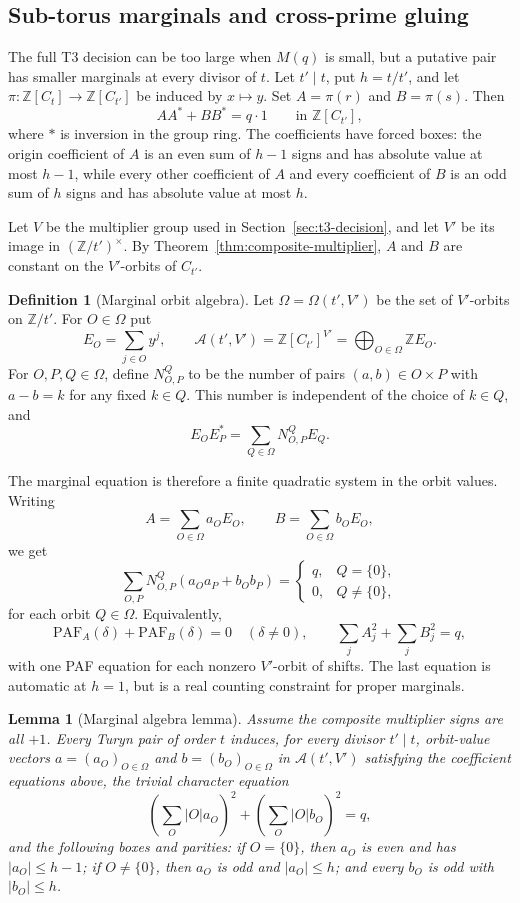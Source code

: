 \documentclass[11pt]{article}
\theoremstyle{plain}
\newtheorem{lemma}[theorem]{Lemma}
\theoremstyle{definition}
\newtheorem{definition}[theorem]{Definition}
\theoremstyle{remark}
\newcommand{\Z}{\mathbb Z}
\newcommand{\paf}{\mathrm{PAF}}
\begin{document}
\subsection{Sub-torus marginals and cross-prime gluing}\label{sec:t2-marginal}

The full T3 decision can be too large when $M(q)$ is small, but a putative pair
has smaller marginals at every divisor of $t$. Let $t'\mid t$, put $h=t/t'$, and
let $\pi:\Z[C_t]\to\Z[C_{t'}]$ be induced by $x\mapsto y$. Set
$A=\pi(r)$ and $B=\pi(s)$. Then
\[
  AA^*+BB^*=q\cdot1\qquad\text{in }\Z[C_{t'}],
\]
where $*$ is inversion in the group ring. The coefficients have forced boxes:
the origin coefficient of $A$ is an even sum of $h-1$ signs and has absolute
value at most $h-1$, while every other coefficient of $A$ and every coefficient
of $B$ is an odd sum of $h$ signs and has absolute value at most $h$.

Let $V$ be the multiplier group used in Section~\ref{sec:t3-decision}, and let
$V'$ be its image in $(\Z/t')^\times$. By
Theorem~\ref{thm:composite-multiplier}, $A$ and $B$ are constant on the
$V'$-orbits of $C_{t'}$.

\begin{definition}[Marginal orbit algebra]\label{def:marginal-orbit-algebra}
Let $\Omega=\Omega(t',V')$ be the set of $V'$-orbits on $\Z/t'$. For
$O\in\Omega$ put
\[
  E_O=\sum_{j\in O} y^j,\qquad
  \mathcal A(t',V')=\Z[C_{t'}]^{V'}=\bigoplus_{O\in\Omega}\Z E_O .
\]
For $O,P,Q\in\Omega$, define $N_{O,P}^Q$ to be the number of pairs
$(a,b)\in O\times P$ with $a-b=k$ for any fixed $k\in Q$. This number is
independent of the choice of $k\in Q$, and
\[
  E_OE_P^*=\sum_{Q\in\Omega}N_{O,P}^Q E_Q .
\]
\end{definition}

The marginal equation is therefore a finite quadratic system in the orbit
values. Writing
\[
  A=\sum_{O\in\Omega}a_OE_O,\qquad
  B=\sum_{O\in\Omega}b_OE_O,
\]
we get
\[
  \sum_{O,P}N_{O,P}^Q(a_Oa_P+b_Ob_P)
  =\begin{cases} q,& Q=\{0\},\\ 0,& Q\ne\{0\},\end{cases}
\]
for each orbit $Q\in\Omega$. Equivalently,
\[
  \paf_A(\delta)+\paf_B(\delta)=0
  \quad(\delta\ne0),
  \qquad
  \sum_j A_j^2+\sum_j B_j^2=q,
\]
with one PAF equation for each nonzero $V'$-orbit of shifts. The last equation
is automatic at $h=1$, but is a real counting constraint for proper marginals.

\begin{lemma}[Marginal algebra lemma]\label{lem:marginal-algebra}
Assume the composite multiplier signs are all $+1$. Every Turyn pair of order
$t$ induces, for every divisor $t'\mid t$, orbit-value vectors
$a=(a_O)_{O\in\Omega}$ and $b=(b_O)_{O\in\Omega}$ in
$\mathcal A(t',V')$ satisfying the coefficient equations above, the trivial
character equation
\[
  \left(\sum_O |O|a_O\right)^2+\left(\sum_O |O|b_O\right)^2=q,
\]
and the following boxes and parities: if $O=\{0\}$, then $a_O$ is even and
has $|a_O|\le h-1$; if $O\ne\{0\}$, then $a_O$ is odd and $|a_O|\le h$; and
every $b_O$ is odd with $|b_O|\le h$.
\end{lemma}
\end{document}
